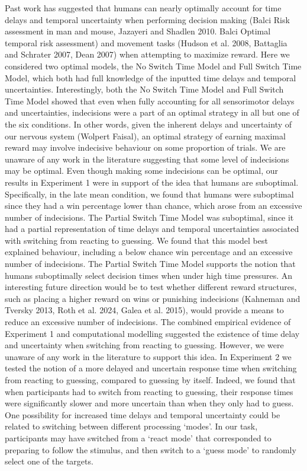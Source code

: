 \documentclass[12pt,letterpaper]{article}
\begin{document}
Past work has suggested that humans can nearly optimally account for time delays and temporal uncertainty when performing decision making (Balci Risk assessment in man and mouse, Jazayeri and Shadlen 2010. Balci Optimal temporal risk assessment) and movement tasks (Hudson et al. 2008, Battaglia and Schrater 2007, Dean 2007) when attempting to maximize reward. Here we considered two optimal models, the No Switch Time Model and Full Switch Time Model, which both had full knowledge of the inputted time delays and temporal uncertainties. Interestingly, both the No Switch Time Model and Full Switch Time Model showed that even when fully accounting for all sensorimotor delays and uncertainties, indecisions were a part of an optimal strategy in all but one of the six conditions. In other words, given the inherent delays and uncertainty of our nervous system (Wolpert Faisal), an optimal strategy of earning maximal reward may involve indecisive behaviour on some proportion of trials. We are unaware of any work in the literature suggesting that some level of indecisions may be optimal. Even though making some indecisions can be optimal, our results in Experiment 1 were in support of the idea that humans are suboptimal. Specifically, in the late mean condition, we found that humans were suboptimal since they had a win percentage lower than chance, which arose from an excessive number of indecisions. The Partial Switch Time Model was suboptimal, since it had a partial representation of time delays and temporal uncertainties associated with switching from reacting to guessing. We found that this model best explained behaviour, including a below chance win percentage and an excessive number of indecisions. The Partial Switch Time Model supports the notion that humans suboptimally select decision times when under high time pressures. An interesting future direction would be to test whether different reward structures, such as placing a higher reward on wins or punishing indecisions (Kahneman and Tversky 2013, Roth et al. 2024, Galea et al. 2015), would provide a means to reduce an excessive number of indecisions.
The combined empirical evidence of Experiment 1 and computational modelling suggested the existence of time delay and uncertainty when switching from reacting to guessing. However, we were unaware of any work in the literature to support this idea. In Experiment 2 we tested the notion of a more delayed and uncertain response time when switching from reacting to guessing, compared to guessing by itself. Indeed, we found that when participants had to switch from reacting to guessing, their response times were significantly slower and more uncertain than when they only had to guess. One possibility for increased time delays and temporal uncertainty could be related to switching between different processing ‘modes’. In our task, participants may have switched from a `react mode’ that corresponded to preparing to follow the stimulus, and then switch to a `guess mode’ to randomly select one of the targets.
\end{document}
